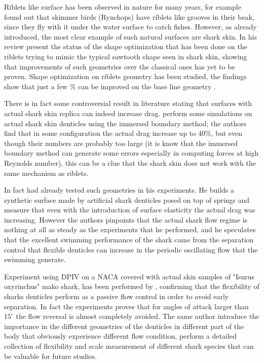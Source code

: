 Riblets like surface has been observed in nature for many years, for example \citet{Martin2016riblets} found out that skimmer birds (Rynchops) have riblets like grooves in their beak, since they fly with it under the water surface to catch fishes.
However, as already introduced, the most clear example of such natural surfaces are shark skin.
In his review \citet{dean2010shark} present the status of the shape optimization that has been done on the riblets trying to mimic the typical sawtooth shape seen in shark skin, showing that improvements of such geometries over the classical ones has yet to be proven.
Shape optimization on riblets geometry has been studied, the findings show that just a few $\%$ can be improved on the base line geometry \citet{bechert1997experiments}.

There is in fact some controversial result in literature stating that surfaces with actual shark skin replica can indeed increase drag.
\citet{boomsma2016direct} perform some simulations on actual shark skin denticles using the immersed boundary method; the authors find that in some configuration 
the actual drag increase up to $40\%$, but even though their numbers are probably too large (it is know that the immersed boundary method can generate some errors especially in computing forces at high Reynolds number), this can be a clue that the shark skin does not work with the same mechanism as riblets.

In fact \citet{bechert1997natural} had already tested such geometries in his experiments. 
He builds a synthetic surface made by artificial shark denticles posed on top of springs and measure that even with the introduction of  surface elasticity the actual drag was increasing.
However the authors pinpoints that the actual shark flow regime is nothing at all as steady as the experiments that he performed, and he speculates that the excellent swimming performance of the shark came from the separation control that flexible denticles can increase in the periodic oscillating flow that the swimming generate.

Experiment using DPIV on a NACA covered with actual skin samples of "Isurus oxyrinchus" mako shark, has been performed by \citet{lang2014SharkControl}, confirming that the flexibility of sharks denticles perform as a passive flow control in order to avoid early separation.
In fact the experiments proves that for angles of attack larger than $15^{\circ}$ the flow reversal is almost completely avoided.
The same author introduce the importance in the different geometries of the denticles in different part of the body that obviously experience different flow condition,
\citet{motta2012Shark} perform a detailed collection of flexibility and scale measurement of different shark species that can be valuable for future studies.

